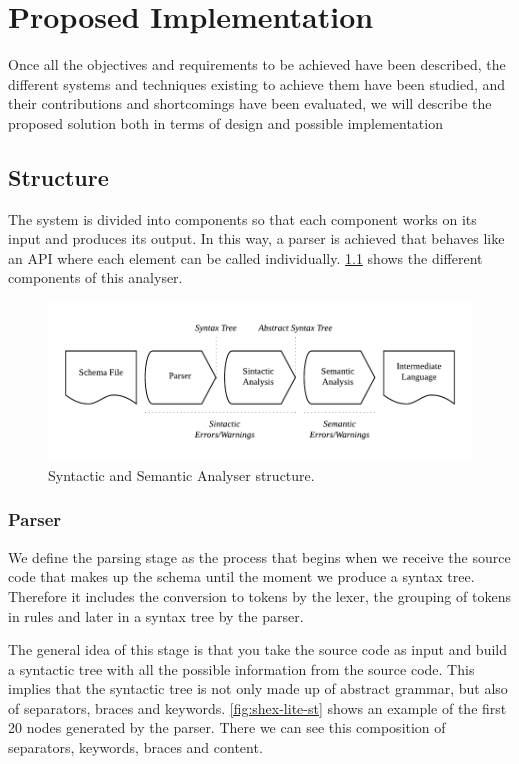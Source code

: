 \chapter{Proposed Implementation}
\label{ch:proposed-implementation}

Once all the objectives and requirements to be achieved have been described,
the different systems and techniques existing to achieve them have been studied,
and their contributions and shortcomings have been evaluated, we will describe
the proposed solution both in terms of design and possible implementation

\section{Structure}
The system is divided into components so that each component works on its input
and produces its output. In this way, a parser is achieved that behaves like
an API where each element can be called individually. \cref{fig:shex-lite-sema}
shows the different components of this analyser.

\begin{figure}
    \includegraphics[width=\textwidth]{images/sin-sem-structure.pdf}
    \centering
    \caption[Syntactic and Semantic Analyser structure]{Syntactic and Semantic Analyser structure.}
    \label{fig:shex-lite-sema}
\end{figure}

\subsection{Parser}
We define the parsing stage as the process that begins when we receive the source code that makes up
the schema until the moment we produce a syntax tree. Therefore it includes the conversion to tokens
by the lexer, the grouping of tokens in rules and later in a syntax tree by the parser.

The general idea of this stage is that you take the source code as input and build a syntactic tree with all
the possible information from the source code. This implies that the syntactic tree is not only made up of
abstract grammar, but also of separators, braces and keywords. \cref{fig:shex-lite-st} shows an example
of the first 20 nodes generated by the parser. There we can see this composition of separators, keywords, braces
and content.

